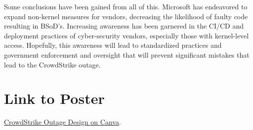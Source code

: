 Some conclusions have been gained from all of this. Microsoft has endeavored to expand non-kernel measures for vendors, decreasing the likelihood of faulty code resulting in BSoD's. Increasing awareness has been garnered in the CI/CD and deployment practices of cyber-security vendors, especially those with kernel-level access. Hopefully, this awareness will lead to standardized practices and government enforcement and oversight that will prevent significant mistakes that lead to the CrowdStrike outage. \hfill \cite{utility_dive_crowdstrike, homeland_committee_crowdstrike, sc_media_crowdstrike_outage}


\section{Link to Poster}
\href{https://www.canva.com/design/DAGYFT-oIGI/HfmDUd-mdGLTYA6mVfXg6A/edit?utm_content=DAGYFT-oIGI&utm_campaign=designshare&utm_medium=link2&utm_source=sharebutton}{CrowdStrike Outage Design on Canva}.
